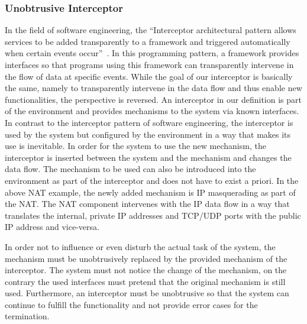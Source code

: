 \subsubsection{Unobtrusive Interceptor}
In the field of software engineering, the ``Interceptor architectural pattern allows services to be added transparently to a framework and triggered automatically when certain events occur''~\cite{schmidt2013pattern}.
In this programming pattern, a framework provides interfaces so that programs using this framework can transparently intervene in the flow of data at specific events.
While the goal of our interceptor is basically the same, namely to transparently intervene in the data flow and thus enable new functionalities, the perspective is reversed.
An interceptor in our definition is part of the environment and provides mechanisms to the system via known interfaces. 
In contrast to the interceptor pattern of software engineering, the interceptor is used by the system but configured by the environment in a way that makes its use is inevitable.
In order for the system to use the new mechanism, the interceptor is inserted between the system and the mechanism and changes the data flow.
The mechanism to be used can also be introduced into the environment as part of the interceptor and does not have to exist a priori.
In the above NAT example, the newly added mechanism is IP masquerading as part of the NAT.
The NAT component intervenes with the IP data flow in a way that translates the internal, private IP addresses and TCP/UDP ports with the public IP address and vice-versa.

In order not to influence or even disturb the actual task of the system, the mechanism must be unobtrusively replaced by the provided mechanism of the interceptor.
The system must not notice the change of the mechanism, on the contrary the used interfaces must pretend that the original mechanism is still used.
Furthermore, an interceptor must be unobtrusive so that the system can continue to fulfill the functionality and not provide error cases for the termination.

